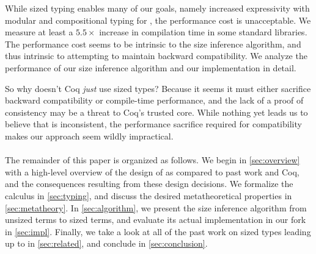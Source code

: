 While sized typing enables many of our goals, namely increased expressivity with modular and compositional typing for \cofixpoints, the performance cost is unacceptable.
We measure at least a $5.5 \times$ increase in compilation time in some standard libraries.
The performance cost seems to be intrinsic to the size inference algorithm, and thus intrinsic to attempting to maintain backward compatibility.
We analyze the performance of our size inference algorithm and our implementation in detail.

So why doesn't Coq \emph{just} use sized types?
Because it seems it must either sacrifice backward compatibility or compile-time performance,
and the lack of a proof of consistency may be a threat to Coq's trusted core.
While nothing yet leads us to believe that \lang is inconsistent,
the performance sacrifice required for compatibility makes our approach seem wildly impractical.

\paragraph*{} The remainder of this paper is organized as follows.
We begin in \autoref{sec:overview} with a high-level overview of the design of \lang as compared to past work and Coq,
and the consequences resulting from these design decisions.
We formalize the calculus \lang in \autoref{sec:typing},
and discuss the desired metatheoretical properties in \autoref{sec:metatheory}.
In \autoref{sec:algorithm}, we present the size inference algorithm from unsized terms to sized \lang terms,
and evaluate its actual implementation in our fork in \autoref{sec:impl}.
Finally, we take a look at all of the past work on sized types leading up to \lang in \autoref{sec:related}, and conclude in \autoref{sec:conclusion}.

